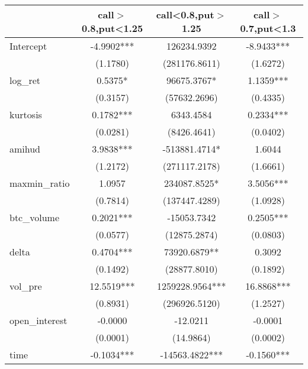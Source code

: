 \begin{tabular}{lccc}
\hline
                   & call$>$0.8,put<1.25 & call<0.8,put$>$1.25 & call$>$0.7,put<1.3  \\
\midrule
\midrule
Intercept          & -4.9902***          & 126234.9392         & -8.9433***          \\
                   & (1.1780)            & (281176.8611)       & (1.6272)            \\
log\_ret           & 0.5375*             & 96675.3767*         & 1.1359***           \\
                   & (0.3157)            & (57632.2696)        & (0.4335)            \\
kurtosis           & 0.1782***           & 6343.4584           & 0.2334***           \\
                   & (0.0281)            & (8426.4641)         & (0.0402)            \\
amihud             & 3.9838***           & -513881.4714*       & 1.6044              \\
                   & (1.2172)            & (271117.2178)       & (1.6661)            \\
maxmin\_ratio      & 1.0957              & 234087.8525*        & 3.5056***           \\
                   & (0.7814)            & (137447.4289)       & (1.0928)            \\
btc\_volume        & 0.2021***           & -15053.7342         & 0.2505***           \\
                   & (0.0577)            & (12875.2874)        & (0.0803)            \\
delta              & 0.4704***           & 73920.6879**        & 0.3092              \\
                   & (0.1492)            & (28877.8010)        & (0.1892)            \\
vol\_pre           & 12.5519***          & 1259228.9564***     & 16.8868***          \\
                   & (0.8931)            & (296926.5120)       & (1.2527)            \\
open\_interest     & -0.0000             & -12.0211            & -0.0001             \\
                   & (0.0001)            & (14.9864)           & (0.0002)            \\
time               & -0.1034***          & -14563.4822***      & -0.1560***          \\

\end{tabular}
